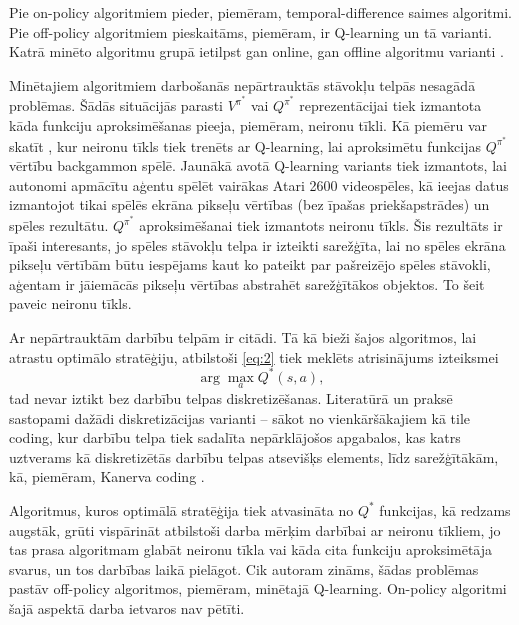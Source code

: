 \documentclass{ludis} %
\begin{document}
Pie on-policy algoritmiem pieder, piemēram, temporal-difference saimes algoritmi. Pie off-policy algoritmiem pieskaitāms, piemēram, ir Q-learning un tā varianti. Katrā minēto algoritmu grupā ietilpst gan online, gan offline algoritmu varianti \autocite{Barto}.

Minētajiem algoritmiem darbošanās nepārtrauktās stāvokļu telpās nesagādā problēmas. Šādās situācijās parasti $V^{\pi^*}$ vai $Q^{\pi^*}$ reprezentācijai tiek izmantota kāda funkciju aproksimēšanas pieeja, piemēram, neironu tīkli. Kā piemēru var skatīt \autocite{tesauro1995temporal}, kur neironu tīkls tiek trenēts ar Q-learning, lai aproksimētu funkcijas $Q^{\pi^*}$ vērtību backgammon spēlē.
Jaunākā avotā \autocite{mnih2013playing} Q-learning variants tiek izmantots, lai autonomi apmācītu aģentu spēlēt vairākas Atari 2600 videospēles, kā ieejas datus izmantojot tikai spēlēs ekrāna pikseļu vērtības (bez īpašas priekšapstrādes) un spēles rezultātu.
$Q^{\pi^*}$ aproksimēšanai tiek izmantots neironu tīkls.
Šis rezultāts ir īpaši interesants, jo spēles stāvokļu telpa ir izteikti sarežģīta, lai no spēles ekrāna pikseļu vērtībām būtu iespējams kaut ko pateikt par pašreizējo spēles stāvokli, aģentam ir jāiemācās pikseļu vērtības abstrahēt sarežģītākos objektos.
To šeit paveic neironu tīkls.

Ar nepārtrauktām darbību telpām ir citādi.
Tā kā bieži šajos algoritmos, lai atrastu optimālo stratēģiju, atbilstoši \eqref{eq:2} tiek meklēts atrisinājums izteiksmei
\[
	\arg \max_a Q^*(s, a),
\]
tad nevar iztikt bez darbību telpas diskretizēšanas.
Literatūrā un praksē sastopami dažādi diskretizācijas varianti -- sākot no vienkāršākajiem kā tile coding, kur darbību telpa tiek sadalīta nepārklājošos apgabalos, kas katrs uztverams kā diskretizētās darbību telpas atsevišķs elements, līdz sarežģītākām, kā, piemēram, Kanerva coding \autocite{Barto}.

Algoritmus, kuros optimālā stratēģija tiek atvasināta no $Q^*$ funkcijas, kā redzams augstāk, grūti vispārināt atbilstoši darba mērķim darbībai ar neironu tīkliem, jo tas prasa algoritmam glabāt neironu tīkla vai kāda cita funkciju aproksimētāja svarus, un tos darbības laikā pielāgot.
Cik autoram zināms, šādas problēmas pastāv off-policy algoritmos, piemēram, minētajā Q-learning.
On-policy algoritmi šajā aspektā darba ietvaros nav pētīti.
\end{document}
